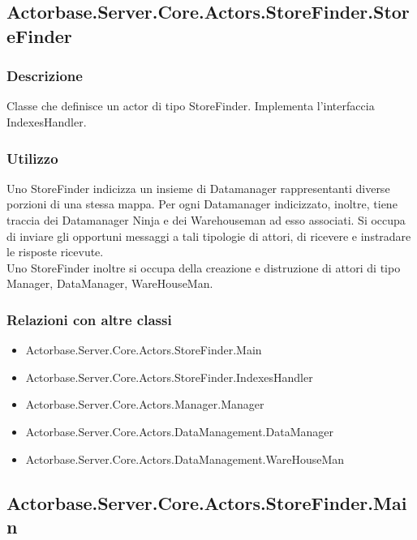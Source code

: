 \documentclass[a4paper]{article}
\begin{document}
		\subsection{Actorbase.Server.Core.Actors.StoreFinder.StoreFinder}
			\subsubsection{Descrizione}
				Classe che definisce un actor di tipo StoreFinder. Implementa l'interfaccia IndexesHandler.
			\subsubsection{Utilizzo}
				Uno StoreFinder indicizza un insieme di Datamanager rappresentanti diverse porzioni di una stessa mappa. Per ogni Datamanager indicizzato, inoltre, tiene traccia dei Datamanager Ninja e dei Warehouseman ad esso associati. Si occupa di inviare gli opportuni messaggi a tali tipologie di attori, di ricevere e instradare le risposte ricevute. 
				\\ Uno StoreFinder inoltre si occupa della creazione e distruzione di attori di tipo Manager, DataManager, WareHouseMan.
			\subsubsection{Relazioni con altre classi}
			\begin{itemize}
				\item Actorbase.Server.Core.Actors.StoreFinder.Main
				\item Actorbase.Server.Core.Actors.StoreFinder.IndexesHandler
				\item Actorbase.Server.Core.Actors.Manager.Manager
				\item Actorbase.Server.Core.Actors.DataManagement.DataManager
				\item Actorbase.Server.Core.Actors.DataManagement.WareHouseMan
			\end{itemize}

		\subsection{Actorbase.Server.Core.Actors.StoreFinder.Main}
\end{document}
